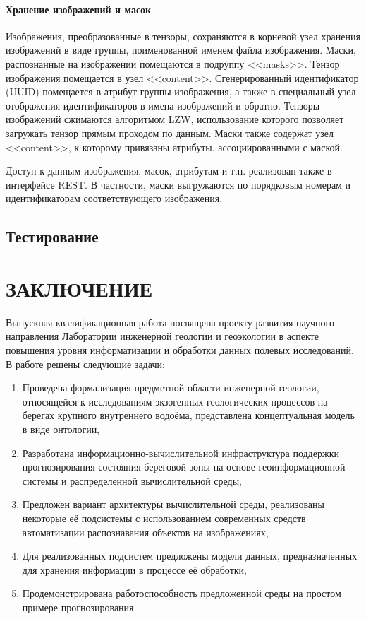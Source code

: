 \documentclass[732,14pt,final]{studrep}
\begin{document}
\subsubsection{Хранение изображений и масок}

Изображения, преобразованные в тензоры, сохраняются в корневой узел хранения изображений в виде группы, поименованной именем файла изображения. Маски, распознанные на изображении помещаются в подруппу <<masks>>. Тензор изображения помещается в узел <<content>>. Сгенерированный идентификатор (UUID) помещается в атрибут группы изображения, а также в специальный узел отображения идентификаторов в имена изображений и обратно. Тензоры изображений сжимаются алгоритмом LZW, использование которого позволяет загружать тензор прямым проходом по данным. Маски также содержат узел <<content>>, к которому привязаны атрибуты, ассоциированными с маской.

Доступ к данным изображения, масок, атрибутам и т.п. реализован также в интерфейсе REST. В частности, маски выгружаются по порядковым номерам и идентификаторам соответствующего изображения.

\section{Тестирование}

\chapter*{ЗАКЛЮЧЕНИЕ}

Выпускная квалификационная работа посвящена проекту развития научного направления Лаборатории инженерной геологии и геоэкологии в аспекте повышения уровня информатизации и обработки данных полевых исследований. В работе решены следующие задачи:
\begin{enumerate}
  \item Проведена формализация предметной области инженерной геологии, относящейся к исследованиям экзогенных геологических процессов на берегах крупного внутреннего водоёма, представлена концептуальная модель в виде онтологии,
  \item Разработана информационно-вычислительной инфраструктура поддержки прогнозирования состояния береговой зоны на основе геоинформационной системы и распределенной вычислительной среды,
  \item Предложен вариант архитектуры вычислительной среды,  реализованы некоторые её подсистемы с использованием современных средств автоматизации распознавания объектов на изображениях,
  \item Для реализованных подсистем предложены модели данных, предназначенных для хранения информации в процессе её обработки,
  \item Продемонстрирована работоспособность предложенной среды на простом примере прогнозирования.
\end{enumerate}
\end{document}
